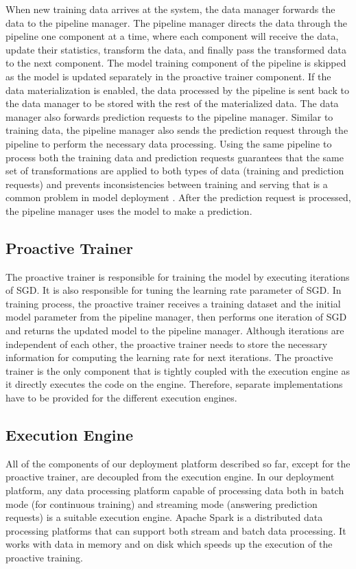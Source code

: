 When new training data arrives at the system, the data manager forwards the data to the pipeline manager. 
The pipeline manager directs the data through the pipeline one component at a time, where each component will receive the data, update their statistics, transform the data, and finally pass the transformed data to the next component.
The model training component of the pipeline is skipped as the model is updated separately in the proactive trainer component.
If the data materialization is enabled, the data processed by the pipeline is sent back to the data manager to be stored with the rest of the materialized data.
The data manager also forwards prediction requests to the pipeline manager.
Similar to training data, the pipeline manager also sends the prediction request through the pipeline to perform the necessary data processing.
Using the same pipeline to process both the training data and prediction requests guarantees that the same set of transformations are applied to both types of data (training and prediction requests) and prevents inconsistencies between training and serving that is a common problem in model deployment \cite{baylor2017tfx}.
After the prediction request is processed, the pipeline manager uses the model to make a prediction.

\subsection{Proactive Trainer} 
The proactive trainer is responsible for training the model by executing iterations of SGD.
It is also responsible for tuning the learning rate parameter of SGD.
In training process, the proactive trainer receives a training dataset and the initial model parameter from the pipeline manager, then performs one iteration of SGD and returns the updated model to the pipeline manager.
Although iterations are independent of each other, the proactive trainer needs to store the necessary information for computing the learning rate for next iterations.
The proactive trainer is the only component that is tightly coupled with the execution engine as it directly executes the code on the engine.
Therefore, separate implementations have to be provided for the different execution engines.

\subsection{Execution Engine}
All of the components of our deployment platform described so far, except for the proactive trainer, are decoupled from the execution engine.
In our deployment platform, any data processing platform capable of processing data both in batch mode (for continuous training) and streaming mode (answering prediction requests) is a suitable execution engine.
Apache Spark \cite{zaharia2010spark} is a distributed data processing platforms that can support both stream and batch data processing.
It works with data in memory and on disk which speeds up the execution of the proactive training.

